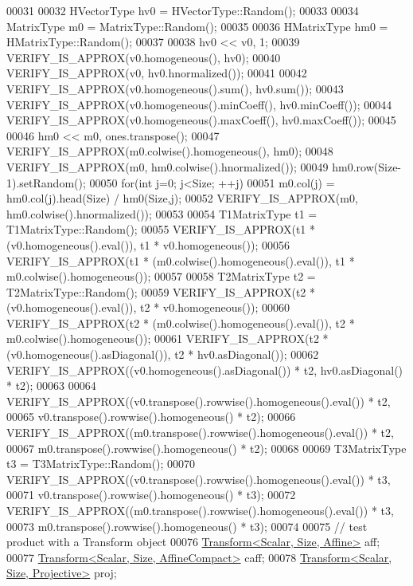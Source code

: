 \begin{DoxyCode}
00031 
00032   HVectorType hv0 = HVectorType::Random();
00033 
00034   MatrixType m0 = MatrixType::Random();
00035 
00036   HMatrixType hm0 = HMatrixType::Random();
00037 
00038   hv0 << v0, 1;
00039   VERIFY\_IS\_APPROX(v0.homogeneous(), hv0);
00040   VERIFY\_IS\_APPROX(v0, hv0.hnormalized());
00041   
00042   VERIFY\_IS\_APPROX(v0.homogeneous().sum(), hv0.sum());
00043   VERIFY\_IS\_APPROX(v0.homogeneous().minCoeff(), hv0.minCoeff());
00044   VERIFY\_IS\_APPROX(v0.homogeneous().maxCoeff(), hv0.maxCoeff());
00045 
00046   hm0 << m0, ones.transpose();
00047   VERIFY\_IS\_APPROX(m0.colwise().homogeneous(), hm0);
00048   VERIFY\_IS\_APPROX(m0, hm0.colwise().hnormalized());
00049   hm0.row(Size-1).setRandom();
00050   \textcolor{keywordflow}{for}(\textcolor{keywordtype}{int} j=0; j<Size; ++j)
00051     m0.col(j) = hm0.col(j).head(Size) / hm0(Size,j);
00052   VERIFY\_IS\_APPROX(m0, hm0.colwise().hnormalized());
00053 
00054   T1MatrixType t1 = T1MatrixType::Random();
00055   VERIFY\_IS\_APPROX(t1 * (v0.homogeneous().eval()), t1 * v0.homogeneous());
00056   VERIFY\_IS\_APPROX(t1 * (m0.colwise().homogeneous().eval()), t1 * m0.colwise().homogeneous());
00057 
00058   T2MatrixType t2 = T2MatrixType::Random();
00059   VERIFY\_IS\_APPROX(t2 * (v0.homogeneous().eval()), t2 * v0.homogeneous());
00060   VERIFY\_IS\_APPROX(t2 * (m0.colwise().homogeneous().eval()), t2 * m0.colwise().homogeneous());
00061   VERIFY\_IS\_APPROX(t2 * (v0.homogeneous().asDiagonal()), t2 * hv0.asDiagonal());
00062   VERIFY\_IS\_APPROX((v0.homogeneous().asDiagonal()) * t2, hv0.asDiagonal() * t2);
00063 
00064   VERIFY\_IS\_APPROX((v0.transpose().rowwise().homogeneous().eval()) * t2,
00065                     v0.transpose().rowwise().homogeneous() * t2);
00066   VERIFY\_IS\_APPROX((m0.transpose().rowwise().homogeneous().eval()) * t2,
00067                     m0.transpose().rowwise().homogeneous() * t2);
00068 
00069   T3MatrixType t3 = T3MatrixType::Random();
00070   VERIFY\_IS\_APPROX((v0.transpose().rowwise().homogeneous().eval()) * t3,
00071                     v0.transpose().rowwise().homogeneous() * t3);
00072   VERIFY\_IS\_APPROX((m0.transpose().rowwise().homogeneous().eval()) * t3,
00073                     m0.transpose().rowwise().homogeneous() * t3);
00074 
00075   \textcolor{comment}{// test product with a Transform object}
00076   \hyperlink{group___geometry___module_class_eigen_1_1_transform}{Transform<Scalar, Size, Affine>} aff;
00077   \hyperlink{group___geometry___module_class_eigen_1_1_transform}{Transform<Scalar, Size, AffineCompact>} caff;
00078   \hyperlink{group___geometry___module_class_eigen_1_1_transform}{Transform<Scalar, Size, Projective>} proj;

\end{DoxyCode}
